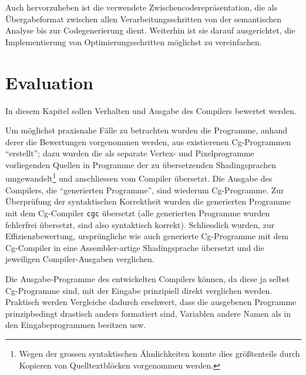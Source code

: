 \documentclass[twoside,a4paper,fleqn,12pt]{book}
\begin{document}
Auch hervorzuheben ist die verwendete Zwischencoderepräsentation, die als Übergabeformat zwischen allen Verarbeitungsschritten von der
semantischen Analyse bis zur Codegenerierung dient. Weiterhin ist sie darauf ausgerichtet, die Implementierung von Optimierungsschritten
möglichst zu vereinfachen.

\chapter{Evaluation}

\newcommand\prglisting[3]{\refstepcounter{program}\label{#1}#3\vspace{-1.5em}\begin{center}{\small Programm \arabic{program}: #2}\end{center}}


In diesem Kapitel sollen Verhalten und Ausgabe des Compilers bewertet werden.

Um möglichst praxisnahe Fälle zu betrachten wurden die Programme, anhand derer die Bewertungen vorgenommen werden,
aus existierenen Cg-Programmen "`erstellt"'; dazu wurden die als separate Vertex- und Pixelprogramme vorliegenden
Quellen in Programme der zu übersetzenden Shadingsprachen umgewandelt\footnote{Wegen der grossen syntaktischen Ähnlichkeiten
konnte dies größtenteils durch Kopieren von Quelltextblöcken vorgenommen werden.} und anschliessen vom Compiler übersetzt.
Die Ausgabe des Compilers, die "`generierten Programme"', sind wiederum Cg-Programme. Zur Überprüfung der syntaktischen Korrektheit wurden die
generierten Programme mit dem Cg-Compiler \verb+cgc+ übersetzt (alle generierten Programme wurden fehlerfrei übersetzt,
sind also syntaktisch korrekt). Schliesslich wurden, zur Effizienzbewertung, ursprüngliche
wie auch generierte Cg-Programme mit dem Cg-Compiler in eine Assembler-artige Shadingsprache übersetzt und die jeweiligen Compiler-Ausgaben verglichen.

Die Ausgabe-Programme des entwickelten Compilers können, da diese ja selbst Cg-Programme sind, mit der Eingabe prinzipiell direkt verglichen
werden. Praktisch werden Vergleiche dadurch erschwert, dass die ausgebenen Programme prinzipbedingt drastisch anders formatiert sind, Variablen andere Namen als in den Eingabeprogrammen besitzen usw.
\end{document}
